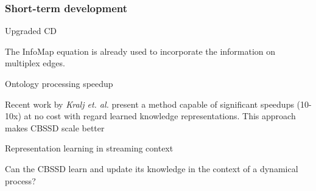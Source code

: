 \documentclass{beamer}
\begin{document}
      \begin{frame}\frametitle{Short-term development}

        \begin{block}{Upgraded CD}

          The InfoMap equation is already used to incorporate the information on multiplex edges.         
        \end{block}

        \begin{block}{Ontology processing speedup}

          Recent work by \textit{Kralj et. al.} present a method capable of significant speedups (10-10x) at no cost with regard learned knowledge representations. This approach makes CBSSD scale better
        \end{block}

        \begin{block}{Representation learning in streaming context}

          Can the CBSSD learn and update its knowledge in the context of a dynamical process? 
          
          \end{block}
        
      \end{frame}
\end{document}

